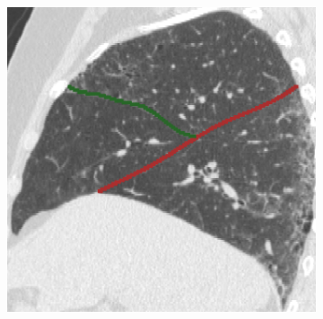 {\begin{figure}[htbp]
\begin{subfigure}{.25\linewidth}
  \caption{}
  \label{fig:IPFSegmentationResults-b} 
\end{subfigure}
\hspace{.3in} %
\begin{subfigure}{.25\linewidth}%
  \includegraphics[width=\linewidth,trim={{.0\wd0} {.0\wd0} {.0\wd0} {.0\wd0}},clip]{Segmentation/Image/IPF203_FinalResult_Sagittal161.png}

\end{subfigure}
\end{figure}}
